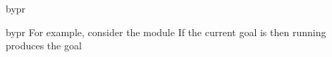 \begin{tactic}{bypr}
\begin{tsyntax}{bypr}
    \medskip For example, consider the module
    If the current goal is
     then
    running 
    produces the goal
  \end{tsyntax}
\end{tactic}

